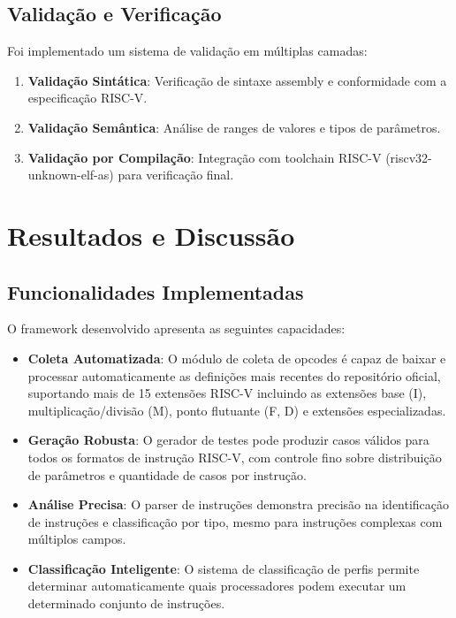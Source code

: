 \documentclass[12pt,a4paper]{article}
\begin{document}
\subsection{Validação e Verificação}

Foi implementado um sistema de validação em múltiplas camadas:

\begin{enumerate}
    \item \textbf{Validação Sintática}: Verificação de sintaxe assembly e conformidade com a especificação RISC-V.
    \item \textbf{Validação Semântica}: Análise de ranges de valores e tipos de parâmetros.
    \item \textbf{Validação por Compilação}: Integração com toolchain RISC-V (riscv32-unknown-elf-as) para verificação final.
\end{enumerate}

\section{Resultados e Discussão}

\subsection{Funcionalidades Implementadas}

O framework desenvolvido apresenta as seguintes capacidades:

\begin{itemize}
    \item \textbf{Coleta Automatizada}: O módulo de coleta de opcodes é capaz de baixar e processar automaticamente as definições mais recentes do repositório oficial, suportando mais de 15 extensões RISC-V incluindo as extensões base (I), multiplicação/divisão (M), ponto flutuante (F, D) e extensões especializadas.
    
    \item \textbf{Geração Robusta}: O gerador de testes pode produzir casos válidos para todos os formatos de instrução RISC-V, com controle fino sobre distribuição de parâmetros e quantidade de casos por instrução.
    
    \item \textbf{Análise Precisa}: O parser de instruções demonstra precisão na identificação de instruções e classificação por tipo, mesmo para instruções complexas com múltiplos campos.
    
    \item \textbf{Classificação Inteligente}: O sistema de classificação de perfis permite determinar automaticamente quais processadores podem executar um determinado conjunto de instruções.
\end{itemize}
\end{document}
